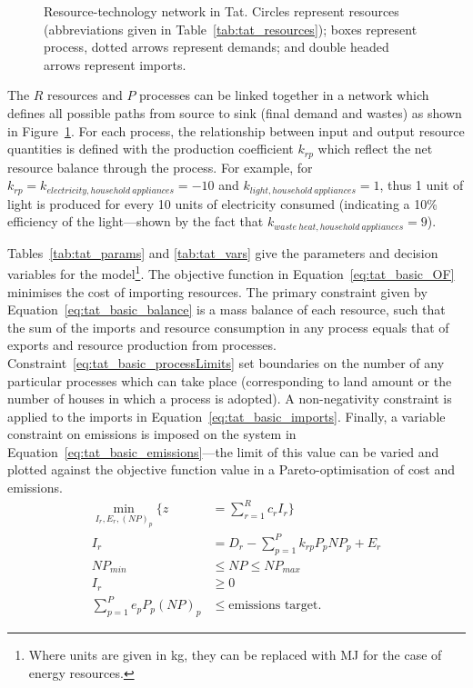 \begin{figure}[h]
	\centering
	
	\caption{Resource-technology network in Tat. Circles represent resources (abbreviations given in Table~\ref{tab:tat_resources}); boxes represent process, dotted arrows represent demands; and double headed arrows represent imports.} \label{fig:tat_network}
\end{figure}

 

The $R$ resources and $P$ processes can be linked together in a network which defines all possible paths from source to sink (final demand and wastes) as shown in Figure~\ref{fig:tat_network}. For each process, the relationship between input and output resource quantities is defined with the production coefficient $k_{rp}$ which reflect the net resource balance through the process. For example, for $k_{rp}=k_{electricity, household~appliances}=-10$ and $k_{light, household~appliances}=1$, thus 1 unit of light is produced for every 10 units of electricity consumed (indicating a 10\% efficiency of the light---shown by the fact that $k_{waste~heat, household~appliances}=9$).

Tables~\ref{tab:tat_params} and \ref{tab:tat_vars} give the parameters and decision variables for the model\footnote{Where units are given in kg, they can be replaced with MJ for the case of energy resources.}. The objective function in Equation~\eqref{eq:tat_basic_OF} minimises the cost of importing resources. The primary constraint given by Equation~\eqref{eq:tat_basic_balance} is a mass balance of each resource, such that the sum of the imports and resource consumption in any process equals that of exports and resource production from processes. Constraint~\eqref{eq:tat_basic_processLimits} set boundaries on the number of any particular processes which can take place (corresponding to land amount or the number of houses in which a process is adopted). A non-negativity constraint is applied to the imports in Equation~\eqref{eq:tat_basic_imports}. Finally, a variable constraint on emissions is imposed on the system in Equation~\eqref{eq:tat_basic_emissions}---the limit of this value can be varied and plotted against the objective function value in a Pareto-optimisation of cost and emissions.
\begin{align}
	\min_{I_r,E_r,(NP)_p} \Bigg\{z&=\sum_{r=1}^R c_rI_{r} \Bigg\} \label{eq:tat_basic_OF} \\
	I_r&=D_r-\sum_{p=1}^{P}k_{rp} P_p NP_p + E_r \label{eq:tat_basic_balance} \\
	NP_{min} &\leq NP \leq NP_{max} \label{eq:tat_basic_processLimits} \\			
	I_r &\geq 0 \label{eq:tat_basic_imports} \\
	\sum_{p=1}^P e_p P_p (NP)_p &\leq \mbox{emissions target} \label{eq:tat_basic_emissions}.
\end{align}
 
 

